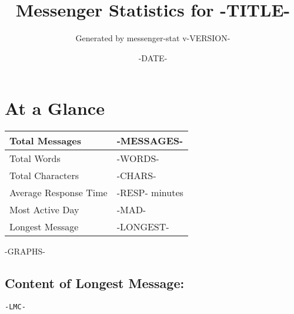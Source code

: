 \documentclass[11pt]{article}
\title{Messenger Statistics for -TITLE-}
\author{Generated by messenger-stat v-VERSION-}
\date{-DATE-}
\begin{document}
\maketitle

\section*{At a Glance}
\begin{center}
    \begin{tabularx}{\textwidth}{ | X | p{6cm} | }
    \hline
        Total Messages & -MESSAGES- \\ \hline
        Total Words & -WORDS- \\ \hline
        Total Characters & -CHARS- \\ \hline
        Average Response Time & -RESP- minutes \\ \hline
        Most Active Day & -MAD- \\ \hline
        Longest Message & -LONGEST- \\
    \hline
    \end{tabularx}
\end{center}

\clearpage
-GRAPHS-

\subsection*{Content of Longest Message:}
\begin{verbatim}
-LMC-
\end{verbatim}
\end{document}
